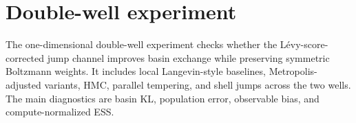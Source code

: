 \section{Double-well experiment}
The one-dimensional double-well experiment checks whether the L\'evy-score-corrected jump channel improves basin exchange while preserving symmetric Boltzmann weights. It includes local Langevin-style baselines, Metropolis-adjusted variants, HMC, parallel tempering, and shell jumps across the two wells. The main diagnostics are basin KL, population error, observable bias, and compute-normalized ESS.
